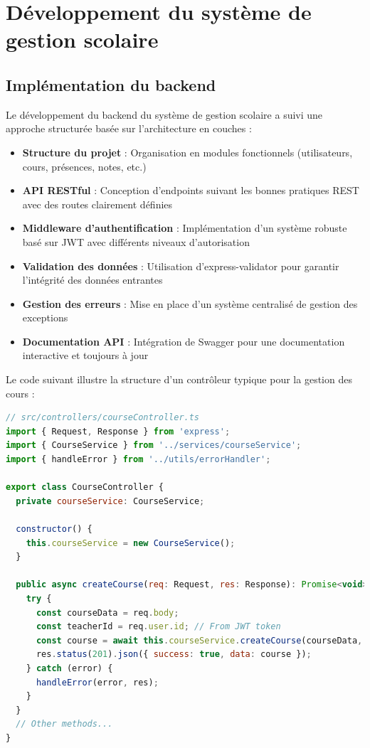 \section{Développement du système de gestion scolaire}

\subsection{Implémentation du backend}
Le développement du backend du système de gestion scolaire a suivi une approche structurée basée sur l'architecture en couches :

\begin{itemize}
  \item \textbf{Structure du projet} : Organisation en modules fonctionnels (utilisateurs, cours, présences, notes, etc.)
  
  \item \textbf{API RESTful} : Conception d'endpoints suivant les bonnes pratiques REST avec des routes clairement définies
  
  \item \textbf{Middleware d'authentification} : Implémentation d'un système robuste basé sur JWT avec différents niveaux d'autorisation
  
  \item \textbf{Validation des données} : Utilisation d'express-validator pour garantir l'intégrité des données entrantes
  
  \item \textbf{Gestion des erreurs} : Mise en place d'un système centralisé de gestion des exceptions
  
  \item \textbf{Documentation API} : Intégration de Swagger pour une documentation interactive et toujours à jour
\end{itemize}

Le code suivant illustre la structure d'un contrôleur typique pour la gestion des cours :

\begin{lstlisting}[style=codestyle, language=JavaScript]
// src/controllers/courseController.ts
import { Request, Response } from 'express';
import { CourseService } from '../services/courseService';
import { handleError } from '../utils/errorHandler';

export class CourseController {
  private courseService: CourseService;
  
  constructor() {
    this.courseService = new CourseService();
  }
  
  public async createCourse(req: Request, res: Response): Promise<void> {
    try {
      const courseData = req.body;
      const teacherId = req.user.id; // From JWT token
      const course = await this.courseService.createCourse(courseData, teacherId);
      res.status(201).json({ success: true, data: course });
    } catch (error) {
      handleError(error, res);
    }
  }
  // Other methods...
}
\end{lstlisting}

